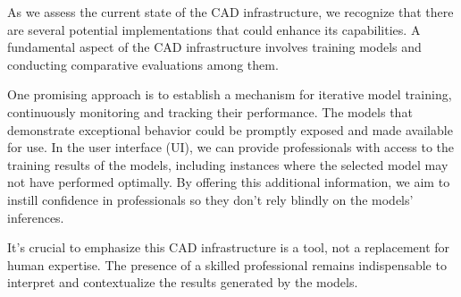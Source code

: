 As we assess the current state of the CAD infrastructure, we recognize that
there are several potential implementations that could enhance its
capabilities. A fundamental aspect of the CAD infrastructure involves training
models and conducting comparative evaluations among them. \newline

One promising approach is to establish a mechanism for iterative model
training, continuously monitoring and tracking their performance. The models
that demonstrate exceptional behavior could be promptly exposed and made
available for use. In the user interface (UI), we can provide professionals
with access to the training results of the models, including instances where
the selected model may not have performed optimally. By offering this
additional information, we aim to instill confidence in professionals so they
don't rely blindly on the models' inferences. \newline

It's crucial to emphasize this CAD infrastructure is a tool, not a
replacement for human expertise. The presence of a skilled professional remains
indispensable to interpret and contextualize the results generated by the
models.
